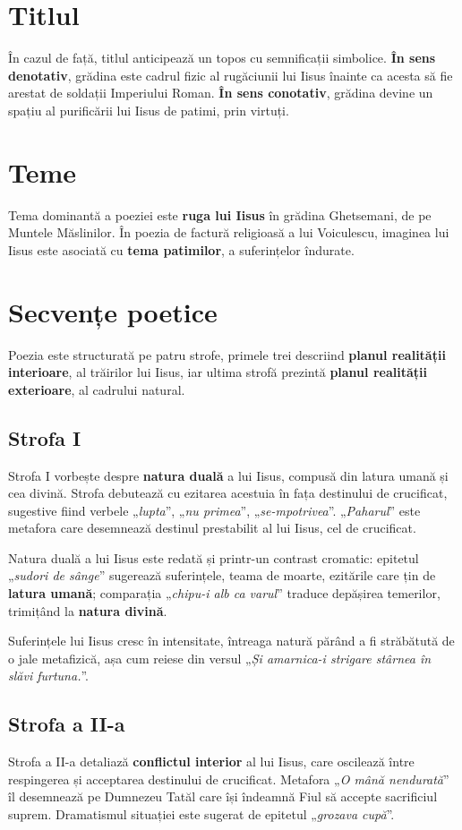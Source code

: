 \documentclass{article}
\newcommand{\qu}[1]{„\emph{#1}”}
\begin{document}
\section{Titlul}
În cazul de față, titlul anticipează un topos cu semnificații simbolice. \textbf{În sens denotativ}, grădina este cadrul fizic al rugăciunii lui Iisus înainte ca acesta să fie arestat de soldații Imperiului Roman. \textbf{În sens conotativ}, grădina devine un spațiu al purificării lui Iisus de patimi, prin virtuți. 

\section{Teme}
Tema dominantă a poeziei este \textbf{ruga lui Iisus} în grădina Ghetsemani, de pe Muntele Măslinilor. În poezia de factură religioasă a lui Voiculescu, imaginea lui Iisus este asociată cu \textbf{tema patimilor}, a suferințelor îndurate.

\section{Secvențe poetice}
Poezia este structurată pe patru strofe, primele trei descriind \textbf{planul realității interioare}, al trăirilor lui Iisus, iar ultima strofă prezintă \textbf{planul realității exterioare}, al cadrului natural.

\subsection{Strofa I}
Strofa I vorbește despre \textbf{natura duală} a lui Iisus, compusă din latura umană și cea divină. Strofa debutează cu ezitarea acestuia în fața destinului de crucificat, sugestive fiind verbele \qu{lupta}, \qu{nu primea}, \qu{se-mpotrivea}. \qu{Paharul} este metafora care desemnează destinul prestabilit al lui Iisus, cel de crucificat.

Natura duală a lui Iisus este redată și printr-un contrast cromatic: epitetul \qu{sudori de sânge} sugerează suferințele, teama de moarte, ezitările care țin de \textbf{latura umană}; comparația \qu{chipu-i alb ca varul} traduce depășirea temerilor, trimițând la \textbf{natura divină}.

Suferințele lui Iisus cresc în intensitate, întreaga natură părând a fi străbătută de o jale metafizică, așa cum reiese din versul \qu{Și amarnica-i strigare stârnea în slăvi furtuna.}.

\subsection{Strofa a II-a}
Strofa a II-a detaliază \textbf{conflictul interior} al lui Iisus, care oscilează între respingerea și acceptarea destinului de crucificat. Metafora \qu{O mână nendurată} îl desemnează pe Dumnezeu Tatăl care își îndeamnă Fiul să accepte sacrificiul suprem. Dramatismul situației este sugerat de epitetul \qu{grozava cupă}.
\end{document}

